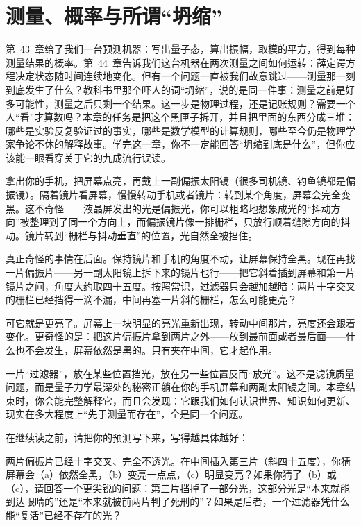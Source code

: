 \chapter{测量、概率与所谓“坍缩”}

第~43~章给了我们一台预测机器：写出量子态，算出振幅，取模的平方，得到每种测量结果的概率。第~44~章告诉我们这台机器在两次测量之间如何运转：薛定谔方程决定状态随时间连续地变化。但有一个问题一直被我们故意跳过——测量那一刻到底发生了什么？教科书里那个吓人的词“坍缩”，说的是同一件事：测量之前是好多可能性，测量之后只剩一个结果。这一步是物理过程，还是记账规则？需要一个人“看”才算数吗？本章的任务是把这个黑匣子拆开，并且把里面的东西分成三堆：哪些是实验反复验证过的事实，哪些是数学模型的计算规则，哪些至今仍是物理学家争论不休的解释故事。学完这一章，你不一定能回答“坍缩到底是什么”，但你应该能一眼看穿关于它的九成流行误读。


拿出你的手机，把屏幕点亮，再戴上一副偏振太阳镜（很多司机镜、钓鱼镜都是偏振镜）。隔着镜片看屏幕，慢慢转动手机或者镜片：转到某个角度，屏幕会完全变黑。这不奇怪——液晶屏发出的光是偏振光，你可以粗略地想象成光的“抖动方向”被整理到了同一个方向上，而偏振镜片像一排栅栏，只放行顺着缝隙方向的抖动。镜片转到“栅栏与抖动垂直”的位置，光自然全被挡住。

真正奇怪的事情在后面。保持镜片和手机的角度不动，让屏幕保持全黑。现在再找一片偏振片——另一副太阳镜上拆下来的镜片也行——把它斜着插到屏幕和第一片镜片之间，角度大约取四十五度。按照常识，过滤器只会越加越暗：两片十字交叉的栅栏已经挡得一滴不漏，中间再塞一片斜的栅栏，怎么可能更亮？

可它就是更亮了。屏幕上一块明显的亮光重新出现，转动中间那片，亮度还会跟着变化。更奇怪的是：把这片偏振片拿到两片之外——放到最前面或者最后面——什么也不会发生，屏幕依然是黑的。只有夹在中间，它才起作用。

一片“过滤器”，放在某些位置挡光，放在另一些位置反而“放光”。这不是滤镜质量问题，而是量子力学最深处的秘密正躺在你的手机屏幕和两副太阳镜之间。本章结束时，你会能完整解释它，而且会发现：它跟我们如何认识世界、知识如何更新、现实在多大程度上“先于测量而存在”，全是同一个问题。


在继续读之前，请把你的预测写下来，写得越具体越好：

两片偏振片已经十字交叉、完全不透光。在中间插入第三片（斜四十五度），你猜屏幕会（a）依然全黑，（b）变亮一点点，（c）明显变亮？如果你猜了（b）或（c），请回答一个更尖锐的问题：第三片挡掉了一部分光，这部分光是“本来就能到达眼睛的”还是“本来就被前两片判了死刑的”？如果是后者，一个过滤器凭什么能“复活”已经不存在的光？

